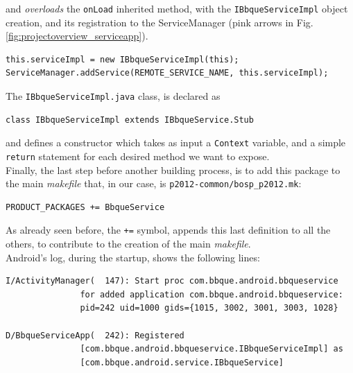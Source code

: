 and \textit{overloads} the \texttt{onLoad} inherited method, with the \texttt{IBbqueServiceImpl} object creation, and its registration to the ServiceManager (pink arrows in Fig. \ref{fig:projectoverview_serviceapp}).
\begin{verbatim}
this.serviceImpl = new IBbqueServiceImpl(this);
ServiceManager.addService(REMOTE_SERVICE_NAME, this.serviceImpl);
\end{verbatim}
The \texttt{IBbqueServiceImpl.java} class, is declared as
\begin{verbatim}
class IBbqueServiceImpl extends IBbqueService.Stub
\end{verbatim}
and defines a constructor which takes as input a \texttt{Context} variable, and a simple \texttt{return} statement for each desired method we want to expose.\\
Finally, the last step before another building process, is to add this package to the main \textit{makefile} that, in our case, is \texttt{p2012-common/bosp\_p2012.mk}:
\begin{verbatim}
PRODUCT_PACKAGES += BbqueService
\end{verbatim}
As already seen before, the \texttt{+=} symbol, appends this last definition to all the others, to contribute to the creation of the main \textit{makefile}.\\
Android's log, during the startup, shows the following lines:
\begin{verbatim}
I/ActivityManager(  147): Start proc com.bbque.android.bbqueservice
               for added application com.bbque.android.bbqueservice:
               pid=242 uid=1000 gids={1015, 3002, 3001, 3003, 1028}
               
D/BbqueServiceApp(  242): Registered 
               [com.bbque.android.bbqueservice.IBbqueServiceImpl] as
               [com.bbque.android.service.IBbqueService]
\end{verbatim}
